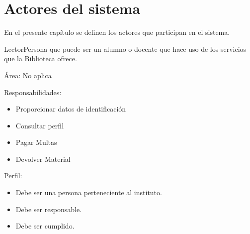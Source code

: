 
\chapter{Actores del sistema}
\label{chapter:ActoresDelSistema}

En el presente capítulo se definen los actores que participan en el sistema.


\begin{Actor}{Lector}{Persona que puede ser un alumno o docente que hace uso de los servicios que la Biblioteca ofrece.}
	\item[Área:] No aplica
	\item[Responsabilidades:] \hspace{1pt}
	\begin{itemize}
		\item Proporcionar datos de identificación
		\item Consultar perfil
		\item Pagar Multas
		\item Devolver Material
	\end{itemize}
	\item[Perfil:] \hspace{1pt}
	\begin{itemize}
		\item Debe ser una persona perteneciente al instituto. 		
		\item Debe ser responsable.
		\item Debe ser cumplido.
	\end{itemize}
\end{Actor}

